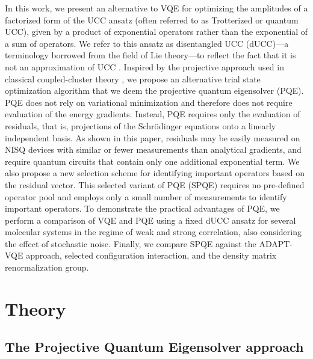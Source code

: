 \documentclass[aps,prx, reprint]{revtex4-2}
\newcommand*{\qucc}{dUCC\xspace}
\begin{document}
In this work, we present an alternative to VQE for optimizing the amplitudes of a factorized form of the UCC ansatz (often referred to as Trotterized \cite{McClean:2016bs} or quantum \cite{Barkoutsos:2018hm} UCC), given by a product of exponential operators rather than the exponential of a sum of operators. We refer to this ansatz as disentangled UCC (\qucc)---a terminology borrowed from the field of Lie theory---to reflect the fact that it is not an approximation of UCC \cite{evangelista2019exact}.
Inspired by the projective approach used in classical coupled-cluster theory \cite{vcivzek1966correlation, vcivzek1969use}, we propose an alternative trial state optimization algorithm that we deem the projective quantum eigensolver (PQE).
PQE does not rely on variational minimization and therefore does not require evaluation of the energy gradients.
Instead, PQE requires only the evaluation of residuals, that is, projections of the Schr\"{o}dinger equations onto a linearly independent basis.
As shown in this paper, residuals may be easily measured on NISQ devices with similar or fewer measurements than analytical gradients, and require quantum circuits that contain only one additional exponential term.
We also propose a new selection scheme for identifying important operators based on the residual vector.
This selected variant of PQE (SPQE) requires no pre-defined operator pool and employs only a small number of measurements to identify important operators.
To demonstrate the practical advantages of PQE, we perform a comparison of VQE and PQE using a fixed \qucc  ansatz for several molecular systems in the regime of weak and strong correlation, also considering the effect of stochastic noise.
Finally, we compare SPQE against the ADAPT-VQE approach, selected configuration interaction, and the density matrix renormalization group.

\section{Theory}
\label{sec:theory}

\subsection{The Projective Quantum Eigensolver approach}
\label{sec:pqe_theory}
\end{document}
